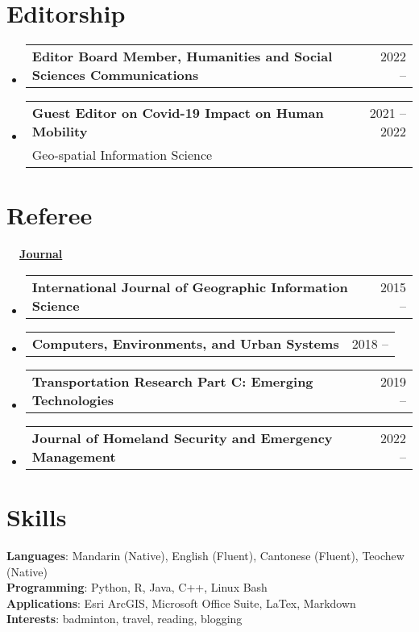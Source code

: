 \documentclass[A4,11pt]{article}
\makeatletter
\newcommand{\CVSubheading}[4]{
  \vspace{-2pt}\item
    \begin{tabular*}{0.97\textwidth}[t]{l@{\extracolsep{\fill}}r}
      \textbf{#1} & #2 \\
      \small#3 & \small #4 \\
    \end{tabular*}\vspace{-7pt}
}
\newcommand{\CVSubheadingSimple}[2]{
  \vspace{-2pt}\item
    \begin{tabular*}{0.97\textwidth}[t]{l@{\extracolsep{\fill}}r}
      \textbf{#1} & #2 \\
    \end{tabular*}\vspace{-7pt}
}
\newcommand{\CVSubHeadingListStart}{\begin{itemize}[leftmargin=0.5cm, label={}]}
\newcommand{\CVSubHeadingListEnd}{\end{itemize}}
\makeatother
\begin{document}
\section{Editorship}
  \CVSubHeadingListStart
    \CVSubheadingSimple
      {Editor Board Member, Humanities and Social Sciences Communications}{2022 --}
      
    \CVSubheading
      {Guest Editor on Covid-19 Impact on Human Mobility}{2021 -- 2022}
      {Geo-spatial Information Science}{}
      
  \CVSubHeadingListEnd

\section{Referee}
\noindent \textbf{\ \ \underline{Journal}}
  \CVSubHeadingListStart

    \CVSubheadingSimple
      {International Journal of Geographic Information Science}{2015 --}
    \CVSubheadingSimple
      {Computers, Environments, and Urban Systems}{2018 --}
    \CVSubheadingSimple
      {Transportation Research Part C: Emerging Technologies}{2019 --}
    \CVSubheadingSimple
      {Journal of Homeland Security and Emergency Management}{2022 --}
  \CVSubHeadingListEnd




\begin{comment}
This section is compressed from the various skills sections that Euro CV
recommends.
\end{comment}

\section{Skills}
 \begin{itemize}[leftmargin=0.5cm, label={}]
    \small{\item{
     \textbf{Languages}{: Mandarin (Native), English (Fluent), Cantonese (Fluent), Teochew (Native)} \\
     \textbf{Programming}{: Python, R, Java, C++, Linux Bash} \\
     \textbf{Applications}{: Esri ArcGIS, Microsoft Office Suite, LaTex, Markdown} \\
     \textbf{Interests}{: badminton, travel, reading, blogging} \\
    }}
 \end{itemize}
    
\end{document}
